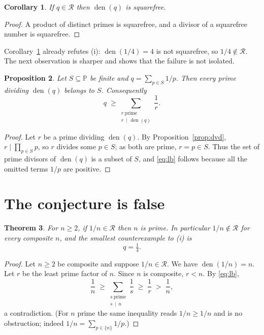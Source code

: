 \documentclass[11pt]{article}
\theoremstyle{plain}
\newtheorem{theorem}{Theorem}
\newtheorem{proposition}[theorem]{Proposition}
\newtheorem{corollary}[theorem]{Corollary}
\theoremstyle{remark}
\begin{document}
\begin{corollary}\label{cor:sqfree}
If $q\in\mathcal R$ then $\operatorname{den}(q)$ is squarefree.
\end{corollary}

\begin{proof}
A product of distinct primes is squarefree, and a divisor of a squarefree
number is squarefree.
\end{proof}

Corollary~\ref{cor:sqfree} already refutes (i): $\operatorname{den}(1/4)=4$ is
not squarefree, so $1/4\notin\mathcal R$. The next observation is sharper and
shows that the failure is not isolated.

\begin{proposition}\label{prop:mem}
Let $S\subseteq\mathbb P$ be finite and $q=\sum_{p\in S}1/p$. Then every prime
dividing $\operatorname{den}(q)$ belongs to $S$. Consequently
\begin{equation}\label{eq:lb}
  q\;\ge\sum_{\substack{r\ \mathrm{prime}\\ r\,\mid\,\operatorname{den}(q)}}\frac1r .
\end{equation}
\end{proposition}

\begin{proof}
Let $r$ be a prime dividing $\operatorname{den}(q)$. By
Proposition~\ref{prop:dvd}, $r\mid\prod_{p\in S}p$, so $r$ divides some
$p\in S$; as both are prime, $r=p\in S$. Thus the set of prime divisors of
$\operatorname{den}(q)$ is a subset of $S$, and \eqref{eq:lb} follows because
all the omitted terms $1/p$ are positive.
\end{proof}

\section{The conjecture is false}

\begin{theorem}\label{thm:main}
For $n\ge2$, if $1/n\in\mathcal R$ then $n$ is prime. In particular
$1/n\notin\mathcal R$ for every composite $n$, and the smallest counterexample
to (i) is
\[
  q=\tfrac14 .
\]
\end{theorem}

\begin{proof}
Let $n\ge2$ be composite and suppose $1/n\in\mathcal R$. We have
$\operatorname{den}(1/n)=n$. Let $r$ be the least prime factor of $n$. Since
$n$ is composite, $r<n$. By \eqref{eq:lb},
\[
  \frac1n\;\ge\sum_{\substack{s\ \mathrm{prime}\\ s\,\mid\,n}}\frac1s\;\ge\;\frac1r\;>\;\frac1n,
\]
a contradiction. (For $n$ prime the same inequality reads $1/n\ge1/n$ and is no
obstruction; indeed $1/n=\sum_{p\in\{n\}}1/p$.)
\end{proof}
\end{document}
